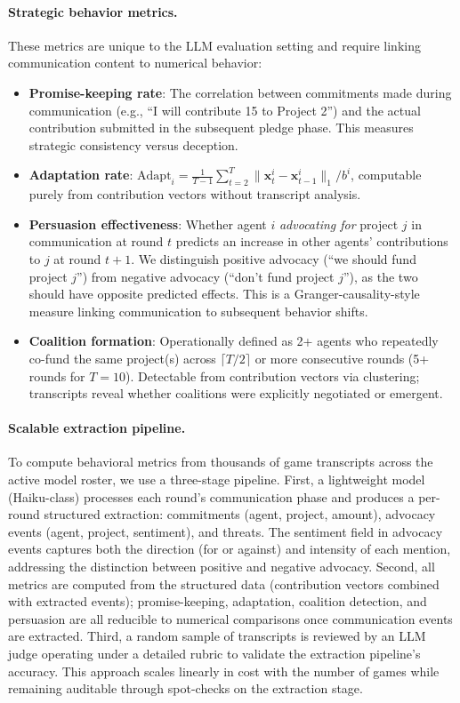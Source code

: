 \paragraph{Strategic behavior metrics.}
These metrics are unique to the LLM evaluation setting and require linking communication content to numerical behavior:
\begin{itemize}
    \item \textbf{Promise-keeping rate}: The correlation between commitments made during communication (e.g., ``I will contribute 15 to Project 2'') and the actual contribution submitted in the subsequent pledge phase. This measures strategic consistency versus deception.
    \item \textbf{Adaptation rate}: $\text{Adapt}_i = \frac{1}{T-1} \sum_{t=2}^{T} \|\bm{x}^i_t - \bm{x}^i_{t-1}\|_1 / b^i$, computable purely from contribution vectors without transcript analysis.
    \item \textbf{Persuasion effectiveness}: Whether agent $i$ \emph{advocating for} project $j$ in communication at round $t$ predicts an increase in other agents' contributions to $j$ at round $t+1$. We distinguish positive advocacy (``we should fund project $j$'') from negative advocacy (``don't fund project $j$''), as the two should have opposite predicted effects. This is a Granger-causality-style measure linking communication to subsequent behavior shifts.
    \item \textbf{Coalition formation}: Operationally defined as 2+ agents who repeatedly co-fund the same project(s) across $\lceil T/2 \rceil$ or more consecutive rounds (5+ rounds for $T = 10$). Detectable from contribution vectors via clustering; transcripts reveal whether coalitions were explicitly negotiated or emergent.
\end{itemize}

\paragraph{Scalable extraction pipeline.}
To compute behavioral metrics from thousands of game transcripts across the active model roster, we use a three-stage pipeline.
First, a lightweight model (Haiku-class) processes each round's communication phase and produces a per-round structured extraction: commitments (agent, project, amount), advocacy events (agent, project, sentiment), and threats.
The sentiment field in advocacy events captures both the direction (for or against) and intensity of each mention, addressing the distinction between positive and negative advocacy.
Second, all metrics are computed from the structured data (contribution vectors combined with extracted events); promise-keeping, adaptation, coalition detection, and persuasion are all reducible to numerical comparisons once communication events are extracted.
Third, a random sample of transcripts is reviewed by an LLM judge operating under a detailed rubric to validate the extraction pipeline's accuracy.
This approach scales linearly in cost with the number of games while remaining auditable through spot-checks on the extraction stage.

